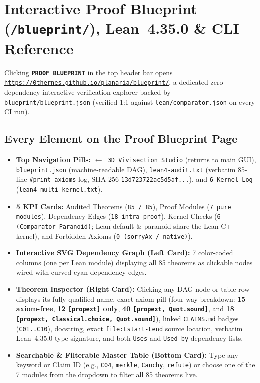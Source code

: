\documentclass[10pt,letterpaper]{article}
\begin{document}
\FloatBarrier
\section{Interactive Proof Blueprint (\texttt{/blueprint/}), Lean~4.35.0 \& CLI Reference}
\label{sec:blueprint}

Clicking \textbf{\texttt{PROOF BLUEPRINT}} in the top header bar opens \href{https://0thernes.github.io/planaria/blueprint/}{\nolinkurl{https://0thernes.github.io/planaria/blueprint/}}, a dedicated zero-dependency interactive verification explorer backed by \texttt{blueprint/blueprint.json} (verified 1:1 against \texttt{lean/comparator.json} on every CI run).

\subsection{Every Element on the Proof Blueprint Page}
\begin{itemize}[leftmargin=1.5em, itemsep=1.5pt]
  \item \textbf{Top Navigation Pills:} \texttt{$\leftarrow$ 3D Vivisection Studio} (returns to main GUI), \texttt{blueprint.json} (machine-readable DAG), \texttt{lean4-audit.txt} (verbatim 85-line \texttt{\#print axioms} log, SHA-256 \texttt{13d723722ac5d5af...}), and \texttt{6-Kernel Log} (\texttt{lean4-multi-kernel.txt}).
  \item \textbf{5 KPI Cards:} Audited Theorems (\texttt{85 / 85}), Proof Modules (\texttt{7 pure modules}), Dependency Edges (\texttt{18 intra-proof}), Kernel Checks (\texttt{6 (Comparator Paranoid)}; Lean default \& paranoid share the Lean C++ kernel), and Forbidden Axioms (\texttt{0 (sorryAx / native)}).
  \item \textbf{Interactive SVG Dependency Graph (Left Card):} 7 color-coded columns (one per Lean module) displaying all 85 theorems as clickable nodes wired with curved cyan dependency edges.
  \item \textbf{Theorem Inspector (Right Card):} Clicking any DAG node or table row displays its fully qualified name, exact axiom pill (four-way breakdown: \textbf{15 axiom-free}, \textbf{12 \texttt{[propext]} only}, \textbf{40 \texttt{[propext, Quot.sound]}}, and \textbf{18 \texttt{[propext, Classical.choice, Quot.sound]}}), linked \texttt{CLAIMS.md} badges (\texttt{C01..C10}), docstring, exact \texttt{file:Lstart-Lend} source location, verbatim Lean~4.35.0 type signature, and both \texttt{Uses} and \texttt{Used by} dependency lists.
  \item \textbf{Searchable \& Filterable Master Table (Bottom Card):} Type any keyword or Claim ID (e.g., \texttt{C04}, \texttt{merkle}, \texttt{Cauchy}, \texttt{refute}) or choose one of the 7 modules from the dropdown to filter all 85 theorems live.
\end{itemize}
\end{document}
